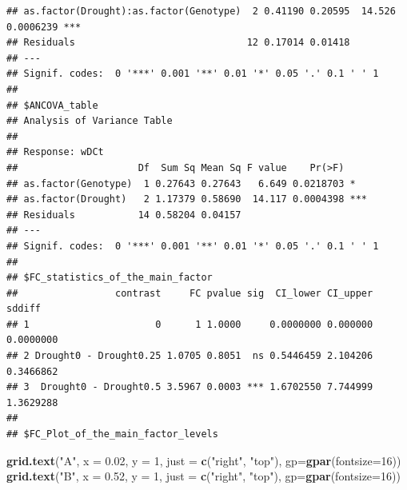 \documentclass[
]{article}
\newenvironment{Shaded}{\begin{snugshade}}{\end{snugshade}}
\newcommand{\AttributeTok}[1]{\textcolor[rgb]{0.13,0.29,0.53}{#1}}
\newcommand{\DecValTok}[1]{\textcolor[rgb]{0.00,0.00,0.81}{#1}}
\newcommand{\FloatTok}[1]{\textcolor[rgb]{0.00,0.00,0.81}{#1}}
\newcommand{\FunctionTok}[1]{\textcolor[rgb]{0.13,0.29,0.53}{\textbf{#1}}}
\newcommand{\NormalTok}[1]{#1}
\newcommand{\StringTok}[1]{\textcolor[rgb]{0.31,0.60,0.02}{#1}}
\begin{document}
\begin{verbatim}
## as.factor(Drought):as.factor(Genotype)  2 0.41190 0.20595  14.526 0.0006239 ***
## Residuals                              12 0.17014 0.01418                      
## ---
## Signif. codes:  0 '***' 0.001 '**' 0.01 '*' 0.05 '.' 0.1 ' ' 1
## 
## $ANCOVA_table
## Analysis of Variance Table
## 
## Response: wDCt
##                     Df  Sum Sq Mean Sq F value    Pr(>F)    
## as.factor(Genotype)  1 0.27643 0.27643   6.649 0.0218703 *  
## as.factor(Drought)   2 1.17379 0.58690  14.117 0.0004398 ***
## Residuals           14 0.58204 0.04157                      
## ---
## Signif. codes:  0 '***' 0.001 '**' 0.01 '*' 0.05 '.' 0.1 ' ' 1
## 
## $FC_statistics_of_the_main_factor
##                 contrast     FC pvalue sig  CI_lower CI_upper    sddiff
## 1                      0      1 1.0000     0.0000000 0.000000 0.0000000
## 2 Drought0 - Drought0.25 1.0705 0.8051  ns 0.5446459 2.104206 0.3466862
## 3  Drought0 - Drought0.5 3.5967 0.0003 *** 1.6702550 7.744999 1.3629288
## 
## $FC_Plot_of_the_main_factor_levels
\end{verbatim}

\begin{Shaded}
\begin{Highlighting}[]
\FunctionTok{grid.text}\NormalTok{(}\StringTok{"A"}\NormalTok{, }\AttributeTok{x =} \FloatTok{0.02}\NormalTok{, }\AttributeTok{y =} \DecValTok{1}\NormalTok{, }\AttributeTok{just =} \FunctionTok{c}\NormalTok{(}\StringTok{"right"}\NormalTok{, }\StringTok{"top"}\NormalTok{), }\AttributeTok{gp=}\FunctionTok{gpar}\NormalTok{(}\AttributeTok{fontsize=}\DecValTok{16}\NormalTok{))}
\FunctionTok{grid.text}\NormalTok{(}\StringTok{"B"}\NormalTok{, }\AttributeTok{x =} \FloatTok{0.52}\NormalTok{, }\AttributeTok{y =} \DecValTok{1}\NormalTok{, }\AttributeTok{just =} \FunctionTok{c}\NormalTok{(}\StringTok{"right"}\NormalTok{, }\StringTok{"top"}\NormalTok{), }\AttributeTok{gp=}\FunctionTok{gpar}\NormalTok{(}\AttributeTok{fontsize=}\DecValTok{16}\NormalTok{))}
\end{Highlighting}
\end{Shaded}
\end{document}
